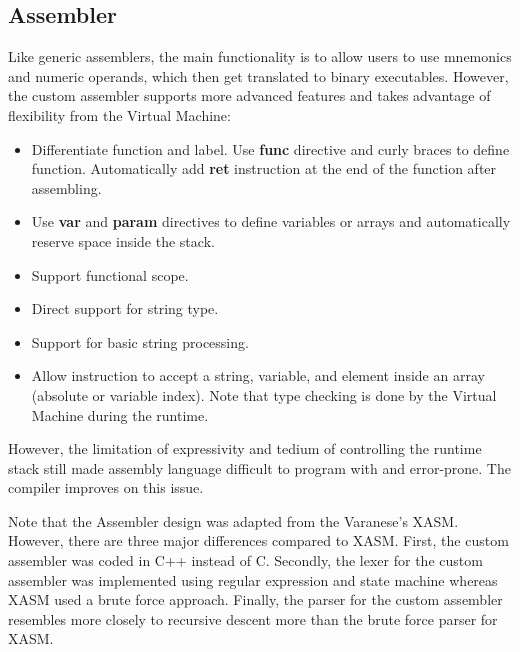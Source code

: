\documentclass[manuscript,screen,nonacm]{acmart}
\begin{document}
\subsection{Assembler}
Like generic assemblers, the main functionality is to allow users to use mnemonics and numeric operands, which then get translated to binary executables. However, the custom assembler supports more advanced features and takes advantage of flexibility from the Virtual Machine:
\begin{itemize}
    \item Differentiate function and label. Use \textbf{func} directive and curly braces to define function. Automatically add \textbf{ret} instruction at the end of the function after assembling.
    \item Use \textbf{var} and \textbf{param} directives to define variables or arrays and automatically reserve space inside the stack.
    \item Support functional scope. 
    \item Direct support for string type.
    \item Support for basic string processing.
    \item Allow instruction to accept a string, variable, and element inside an array (absolute or variable index). Note that type checking is done by the Virtual Machine during the runtime.
\end{itemize}
However, the limitation of expressivity and tedium of controlling the runtime stack still made assembly language difficult to program with and error-prone. The compiler improves on this issue.

Note that the Assembler design was adapted from the Varanese's XASM\cite{Varanese}. However, there are three major differences compared to XASM. First, the custom assembler was coded in C++ instead of C. Secondly, the lexer for the custom assembler was implemented using regular expression and state machine whereas XASM used a brute force approach. Finally, the parser for the custom assembler resembles more closely to recursive descent more than the brute force parser for XASM. 
\end{document}
